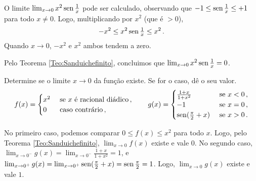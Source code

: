 \begin{ex}\label{Ex:sanduicheseno}
O limite $\lim_{x\to 0}x^2\operatorname{sen} \tfrac1x$ pode ser calculado, observando que
 $-1 \leq \operatorname{sen} \tfrac1x\leq +1$ para todo $x\neq 0$. Logo, multiplicando por $x^2$ (que é
$>0$),
$$-x^2\leq x^2\operatorname{sen} \tfrac1x\leq x^2\,.$$
 Quando $x\to 0$, $-x^2$ e $x^2$ ambos tendem a zero. 
\begin{center}
\begin{bmlimage}\end{bmlimage}
\end{center}
 Pelo Teorema
\ref{Teo:Sanduichefinito},
concluimos que $\lim_{x\to 0}x^2\operatorname{sen} \tfrac1x=0$.
\end{ex}

\begin{exo}\label{Ex:semoulediadiquebis}
Determine se o limite ${x\to 0}$ da função existe. Se for o caso, dê o
seu valor.
$$
f(x)=
\begin{cases}
x^2&\text{ se $x$ é racional diádico}\,,\\
0&\text{ caso contrário}\,,
\end{cases}
\quad\quad 
g(x)=
\begin{cases}
\frac{1+x}{1+x^2}&\text{ se }x<0\,,\\
-1&\text{ se }x=0\,,\\
\operatorname{sen}(\frac{\pi}{2}+x)&\text{ se }x>0\,.
\end{cases}
$$
\begin{sol}
No primeiro caso, podemos comparar $0\leq f(x)\leq x^2$ para todo $x$.
Logo, 
pelo Teorema \ref{Teo:Sanduichefinito},
$\lim_{x\to 0}f(x)$ existe e vale $0$.
No segundo caso, 
$\lim_{x\to 0^-}g(x)=\lim_{x\to 0^-}\frac{1+x}{1+x^2}=1$, e
$\lim_{x\to 0^+}g(x)=\lim_{x\to 0^+}\operatorname{sen}(\frac{\pi}{2}+x)=\operatorname{sen}
\tfrac{\pi}{2}=1$. Logo, $\lim_{x\to 0}g(x)$ existe e vale $1$.
\end{sol}

\end{exo}

